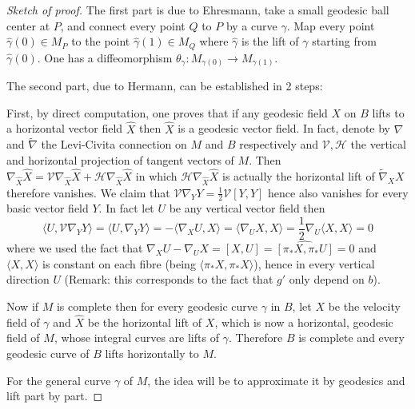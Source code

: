\begin{proof}[Sketch of proof]
The first part is due to Ehresmann, take a small geodesic ball center at \(P\), and connect every point
\(Q\) to \(P\) by a curve \(\gamma\). Map every point \(\hat \gamma(0)\in M_P\)
to the point \(\hat\gamma(1)\in M_Q\) where \(\hat\gamma\) is the lift of
\(\gamma\) starting from \(\hat\gamma(0)\). One has a diffeomorphism \(\theta_\gamma: M_{\gamma(0)} \longrightarrow M_{\gamma(1)}\).

The second part, due to Hermann, can be established in 2 steps:

First, by direct computation, one proves that if any geodesic field \(X\) on \(B\) lifts to a horizontal
vector field \(\hat X\) then \(\hat X\) is a geodesic vector field. In fact, denote by
\(\nabla\) and \(\tilde\nabla\) the Levi-Civita connection on \(M\) and \(B\)
respectively and \(\mathcal{V}, \mathcal{H}\) the vertical and horizontal projection of
tangent vectors of \(M\). Then \(\nabla_{\hat X}\hat X = \mathcal{V}\nabla_{\hat X}\hat X + \mathcal{H}\nabla_{\hat
X}\hat X\) in which \(\mathcal{H}\nabla_{\hat X}\hat X\) is actually the horizontal
lift of \(\tilde\nabla_X X\) therefore vanishes. We claim that \(\mathcal{V}\nabla_{Y}Y = \frac{1}{2}\mathcal{V}[Y,Y]\) hence also vanishes for every basic vector field \(Y\). In fact let \(U\) be any
vertical vector field then
\[
\langle U, \mathcal{V}\nabla_{Y}Y \rangle = \langle U,\nabla_Y Y \rangle = - \langle
\nabla_X U, X \rangle= \langle \nabla_U X, X \rangle = \frac{1}{2}\nabla_U \langle X,X \rangle=0
\]
where we used the fact that \(\nabla_X U -\nabla_U X = [X,U] = \widehat{[\pi_*
X,\pi_* U]} = 0\) and \(\langle X, X \rangle\) is constant on each fibre (being \(\langle
\pi_* X,\pi_* X \rangle\)), hence in
every vertical direction \(U\) (Remark: this corresponds to the fact that \(g'\) only depend
on \(b\)).

Now if \(M\) is complete then for every geodesic curve \(\gamma\)
in \(B\), let \(X\) be the velocity field of \(\gamma\) and \(\hat X\) be the
horizontal lift of \(X\), which is now a horizontal, geodesic field of \(M\), whose
integral curves are lifts of \(\gamma\). Therefore \(B\) is complete and every geodesic curve of \(B\) lifts horizontally to \(M\).

For the general curve \(\gamma\) of \(M\), the idea will be to approximate it by
geodesics and lift part by part.
\end{proof}



